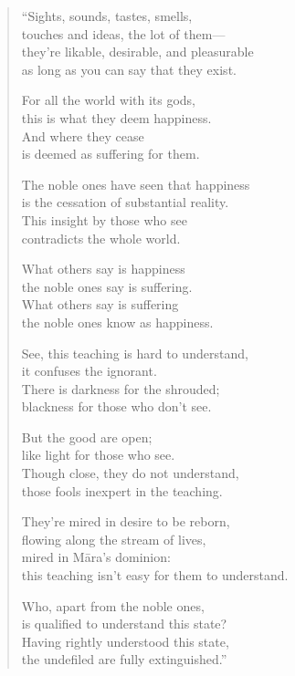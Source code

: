 \documentclass[12pt,openany]{book}%
\begin{document}
\begin{verse}%
“Sights, sounds, tastes, smells, \\
touches and ideas, the lot of them—\\
they’re likable, desirable, and pleasurable \\
as long as you can say that they exist. 

For all the world with its gods, \\
this is what they deem happiness. \\
And where they cease \\
is deemed as suffering for them. 

The noble ones have seen that happiness \\
is the cessation of substantial reality. \\
This insight by those who see \\
contradicts the whole world. 

What others say is happiness \\
the noble ones say is suffering. \\
What others say is suffering \\
the noble ones know as happiness. 

See, this teaching is hard to understand, \\
it confuses the ignorant. \\
There is darkness for the shrouded; \\
blackness for those who don’t see. 

But the good are open; \\
like light for those who see. \\
Though close, they do not understand, \\
those fools inexpert in the teaching. 

They’re mired in desire to be reborn, \\
flowing along the stream of lives, \\
mired in \textsanskrit{Māra}’s dominion: \\
this teaching isn’t easy for them to understand. 

Who, apart from the noble ones, \\
is qualified to understand this state? \\
Having rightly understood this state, \\
the undefiled are fully extinguished.” 

%
\end{verse}
\end{document}
